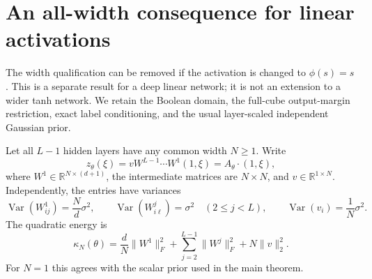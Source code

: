 \section{An all-width consequence for linear activations}
\label{sec:linear}

The width qualification can be removed if the activation is changed to
$\phi(s)=s$. This is a separate result for a deep linear network; it is not
an extension to a wider tanh network. We retain the Boolean domain, the
full-cube output-margin restriction, exact label conditioning, and the
usual layer-scaled independent Gaussian prior.

Let all $L-1$ hidden layers have any common width $N\ge1$. Write
\[
 z_\theta(\xi)=vW^{L-1}\cdots W^1(1,\xi)
              =A_\theta\mathbin{\cdot}(1,\xi),
\]
where $W^1\in\mathbb R^{N\times(d+1)}$, the intermediate matrices are
$N\times N$, and $v\in\mathbb R^{1\times N}$. Independently, the entries
have variances
\[
 \operatorname{Var}(W^1_{ij})=\frac Nd\sigma^2,\qquad
 \operatorname{Var}(W^j_{i\ell})=\sigma^2\quad(2\le j<L),\qquad
 \operatorname{Var}(v_i)=\frac1N\sigma^2.
\]
The quadratic energy is
\[
 \kappa_N(\theta)=\frac dN\|W^1\|_F^2+
       \sum_{j=2}^{L-1}\|W^j\|_F^2+N\|v\|_2^2.
\]
For $N=1$ this agrees with the scalar prior used in the main theorem.


